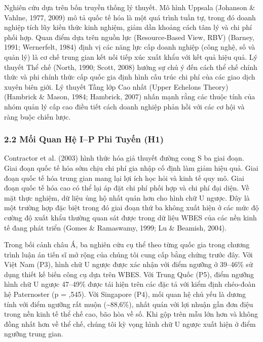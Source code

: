 \documentclass[12pt,a4paper]{article}
\begin{document}
Nghiên cứu dựa trên bốn truyền thống lý thuyết. Mô hình Uppsala
(Johanson \& Vahlne, 1977, 2009) mô tả quốc tế hóa là một quá trình tuần
tự, trong đó doanh nghiệp tích lũy kiến thức kinh nghiệm, giảm dần
khoảng cách tâm lý và chi phí phối hợp. Quan điểm dựa trên nguồn lực
(Resource-Based View, RBV) (Barney, 1991; Wernerfelt, 1984) định vị các
năng lực cấp doanh nghiệp (công nghệ, số và quản lý) là cơ chế trung
gian kết nối tiếp xúc xuất khẩu với kết quả hiệu quả. Lý thuyết Thể chế
(North, 1990; Scott, 2008) hướng sự chú ý đến cách thể chế chính thức và
phi chính thức cấp quốc gia định hình cấu trúc chi phí của các giao dịch
xuyên biên giới. Lý thuyết Tầng lớp Cao nhất (Upper Echelons Theory)
(Hambrick \& Mason, 1984; Hambrick, 2007) nhấn mạnh rằng các thuộc tính
của nhóm quản lý cấp cao điều tiết cách doanh nghiệp phản hồi với các cơ
hội và ràng buộc chiến lược.

\hypertarget{22-mux1ed1i-quan-hux1ec7-ip-phi-tuyux1ebfn-h1}{%
\subsubsection{2.2 Mối Quan Hệ I--P Phi Tuyến
(H1)}\label{22-mux1ed1i-quan-hux1ec7-ip-phi-tuyux1ebfn-h1}}

Contractor et al. (2003) hình thức hóa giả thuyết đường cong S ba giai
đoạn. Giai đoạn quốc tế hóa sớm chịu chi phí gia nhập cố định làm giảm
hiệu quả. Giai đoạn quốc tế hóa trung gian mang lại lợi ích học hỏi và
kinh tế quy mô. Giai đoạn quốc tế hóa cao có thể lại áp đặt chi phí phối
hợp và chi phí đại diện. Về mặt thực nghiệm, dữ liệu ủng hộ nhất quán
hơn cho hình chữ U ngược. Đây là một trường hợp đặc biệt trong đó giai
đoạn thứ ba không xuất hiện ở các mức độ cường độ xuất khẩu thường quan
sát được trong dữ liệu WBES của các nền kinh tế đang phát triển (Gomes
\& Ramaswamy, 1999; Lu \& Beamish, 2004).

Trong bối cảnh châu Á, ba nghiên cứu cụ thể theo từng quốc gia trong
chương trình luận án tiến sĩ mở rộng của chúng tôi cung cấp bằng chứng
trước đây. Với Việt Nam (P3), hình chữ U ngược được xác nhận với điểm
ngưỡng ở 39--46\% sử dụng thiết kế biến công cụ dựa trên WBES. Với Trung
Quốc (P5), điểm ngưỡng hình chữ U ngược 47--49\% được tái hiện trên các
đặc tả với kiểm định chéo-đoàn hệ Paternoster (p = ,545). Với Singapore
(P4), mối quan hệ chủ yếu là dương tính với điểm ngưỡng rất muộn
(\textasciitilde88,6\%), nhất quán với lợi nhuận gần đơn điệu trong nền
kinh tế thể chế cao, bão hòa về số. Khi gộp trên mẫu lớn hơn và không
đồng nhất hơn về thể chế, chúng tôi kỳ vọng hình chữ U ngược xuất hiện ở
điểm ngưỡng trung gian.
\end{document}
